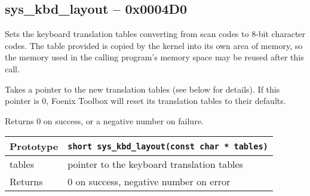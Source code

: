 \subsection*{sys\_kbd\_layout -- 0x0004D0}
Sets the keyboard translation tables converting from scan codes to 8-bit character codes.
The table provided is copied by the kernel into its own area of memory, so the memory used in the calling program's memory space may be reused after this call.

Takes a pointer to the new translation tables (see below for details). If this pointer is 0, Foenix Toolbox will reset its translation tables to their defaults.

Returns 0 on success, or a negative number on failure.

\bigskip

\begin{tabular}{|l||l|} \hline
Prototype & \lstinline!short sys_kbd_layout(const char * tables)! \\ \hline
tables & pointer to the keyboard translation tables \\ \hline
Returns & 0 on success, negative number on error \\ \hline
\end{tabular}

